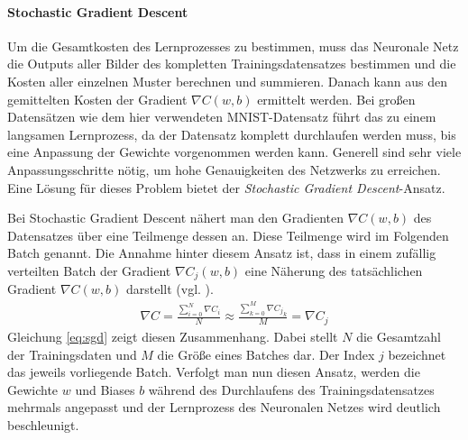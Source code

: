 \documentclass[../main.tex]{subfiles}
\begin{document}
\paragraph{Stochastic Gradient Descent}
Um die Gesamtkosten des Lernprozesses zu bestimmen, muss das Neuronale Netz die Outputs aller Bilder des kompletten Trainingsdatensatzes bestimmen und die Kosten aller einzelnen Muster berechnen und summieren. Danach kann aus den gemittelten Kosten der Gradient $\nabla C(w,b)$ ermittelt werden. Bei großen Datensätzen wie dem hier verwendeten MNIST-Datensatz führt das zu einem langsamen Lernprozess, da der Datensatz komplett durchlaufen werden muss, bis eine Anpassung der Gewichte vorgenommen werden kann. Generell sind sehr viele Anpassungsschritte nötig, um hohe Genauigkeiten des Netzwerks zu erreichen. Eine Lösung für dieses Problem bietet der \emph{Stochastic Gradient Descent}-Ansatz. \par 
Bei Stochastic Gradient Descent nähert man den Gradienten $\nabla C(w,b)$ des Datensatzes über eine Teilmenge dessen an. Diese Teilmenge wird im Folgenden Batch genannt. Die Annahme hinter diesem Ansatz ist, dass in einem zufällig verteilten Batch der Gradient $\nabla C_j(w,b)$ eine Näherung des tatsächlichen Gradient $\nabla C(w,b)$ darstellt (vgl. \cite{NNADL_PIC_CONV_1}). 
\begin{align}\label{eq:sgd}
	\nabla C = \frac{\sum_{i=0}^{N}\nabla C_i}{N} \approx \frac{\sum_{k=0}^{M}\nabla {C_j}_k}{M} = \nabla C_j
\end{align}
Gleichung \ref{eq:sgd} zeigt diesen Zusammenhang. Dabei stellt $N$ die Gesamtzahl der Trainingsdaten und $M$ die Größe eines Batches dar. Der Index $j$ bezeichnet das jeweils vorliegende Batch. Verfolgt man nun diesen Ansatz, werden die Gewichte $w$ und Biases $b$ während des Durchlaufens des Trainingsdatensatzes mehrmals angepasst und der Lernprozess des Neuronalen Netzes wird deutlich beschleunigt. 
\end{document}
